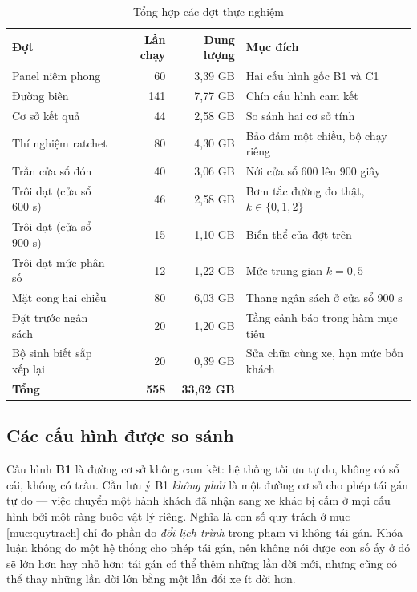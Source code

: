 \begin{table}[htbp]
\centering
\caption{Tổng hợp các đợt thực nghiệm}
\label{bang:quymo}
\small
\begin{tabular}{@{}lrrp{5.6cm}@{}}
\toprule
\textbf{Đợt} & \textbf{Lần chạy} & \textbf{Dung lượng} & \textbf{Mục đích}\\
\midrule
Panel niêm phong & 60 & 3{,}39 GB & Hai cấu hình gốc B1 và C1\\
Đường biên & 141 & 7{,}77 GB & Chín cấu hình cam kết\\
Cơ sở kết quả & 44 & 2{,}58 GB & So sánh hai cơ sở tính\\
Thí nghiệm ratchet & 80 & 4{,}30 GB & Bảo đảm một chiều, bộ chạy riêng\\
Trần cửa sổ đón & 40 & 3{,}06 GB & Nới cửa sổ 600 lên 900 giây\\
Trôi dạt (cửa sổ 600 s) & 46 & 2{,}58 GB & Bơm tắc đường đo thật, $k \in \{0,1,2\}$\\
Trôi dạt (cửa sổ 900 s) & 15 & 1{,}10 GB & Biến thể của đợt trên\\
Trôi dạt mức phân số & 12 & 1{,}22 GB & Mức trung gian $k = 0{,}5$\\
Mặt cong hai chiều & 80 & 6{,}03 GB & Thang ngân sách ở cửa sổ 900 s\\
Đặt trước ngân sách & 20 & 1{,}20 GB & Tầng cảnh báo trong hàm mục tiêu\\
Bộ sinh biết sắp xếp lại & 20 & 0{,}39 GB & Sửa chữa cùng xe, hạn mức bốn khách\\
\midrule
\textbf{Tổng} & \textbf{558} & \textbf{33{,}62 GB} & \\
\bottomrule
\end{tabular}
\end{table}

\subsection{Các cấu hình được so sánh}

Cấu hình \textbf{B1} là đường cơ sở không cam kết: hệ thống tối ưu tự do, không có sổ cái, không
có trần. Cần lưu ý B1 \emph{không phải} là một đường cơ sở cho phép tái gán tự do --- việc
chuyển một hành khách đã nhận sang xe khác bị cấm ở mọi cấu hình bởi một ràng buộc vật lý riêng.
Nghĩa là con số quy trách ở mục \ref{muc:quytrach} chỉ đo phần do \emph{đổi lịch trình} trong phạm vi
không tái gán. Khóa luận không đo một hệ thống cho phép tái gán, nên không nói được con số ấy ở đó
sẽ lớn hơn hay nhỏ hơn: tái gán có thể thêm những lần dời mới, nhưng cũng có thể thay những lần dời
lớn bằng một lần đổi xe ít dời hơn.

